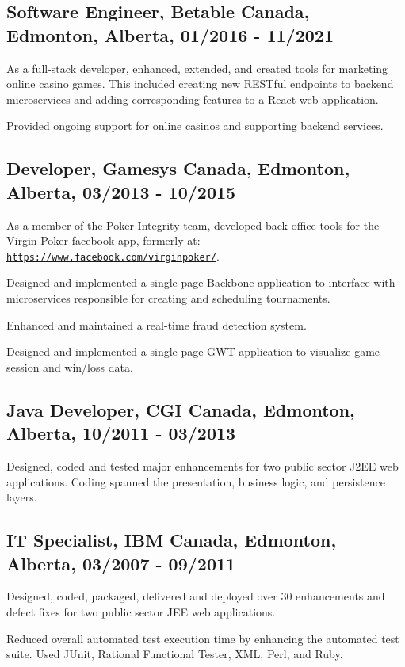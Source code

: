 \documentclass[10.5pt, letterpaper]{article}
\renewenvironment{itemize}{
  \begin{list}{}{
    \setlength{\leftmargin}{1.5em}
  }
}{
  \end{list}
}
\begin{document}
\subsection*{Software Engineer, Betable Canada, Edmonton, Alberta, 01/2016 - 11/2021}
\begin{itemize}
\item As a full-stack developer, enhanced, extended, and created tools for marketing online casino games.
This included creating new RESTful endpoints to backend microservices and adding corresponding features to
a React web application.
\item Provided ongoing support for online casinos and supporting backend services.
\end{itemize}

\subsection*{Developer, Gamesys Canada, Edmonton, Alberta, 03/2013 - 10/2015}
\begin{itemize}
\item As a member of the Poker Integrity team, developed back office tools for the Virgin Poker facebook app, formerly at: \href{https://www.facebook.com/virginpoker/}{\tt https://www.facebook.com/virginpoker/}.
\item Designed and implemented a single-page Backbone application to interface with microservices responsible for
creating and scheduling tournaments.
\item Enhanced and maintained a real-time fraud detection system.
\item Designed and implemented a single-page GWT application to visualize game session and win/loss data.
\end{itemize}

\subsection*{Java Developer, CGI Canada, Edmonton, Alberta, 10/2011 - 03/2013}
\begin{itemize}
\item Designed, coded and tested major enhancements for two public sector J2EE web applications.
Coding spanned the presentation, business logic, and persistence layers.
\end{itemize}

\subsection*{IT Specialist, IBM Canada, Edmonton, Alberta, 03/2007 - 09/2011}
\begin{itemize}
\item Designed, coded, packaged, delivered and deployed over 30 enhancements
and defect fixes for two public sector JEE web applications.
\item Reduced overall automated test execution time by enhancing the automated test suite.
Used JUnit, Rational Functional Tester, XML, Perl, and Ruby.
\end{itemize}
\end{document}
